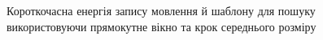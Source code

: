         \begin{figure}[h]
            \centering

            \caption{Короткочасна енергія запису мовлення й шаблону для пошуку використовуючи прямокутне вікно та крок
                середнього розміру}
            \label{fig:audio-energy-rect-half}
        \end{figure}

